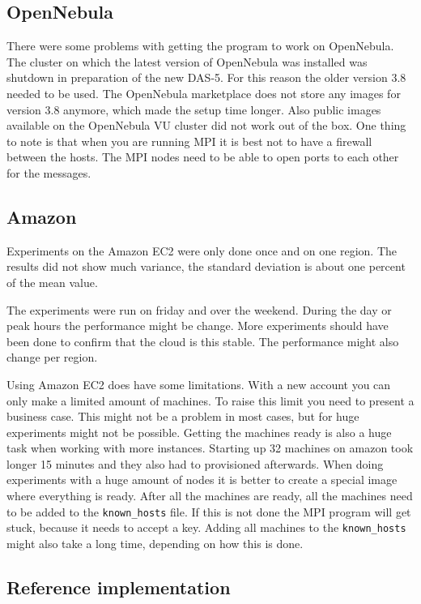 \subsection{OpenNebula}

There were some problems with getting the program to work on OpenNebula. The cluster on which the latest version of OpenNebula was installed was shutdown in preparation of the new DAS-5. For this reason the older version 3.8 needed to be used. The OpenNebula marketplace does not store any images for version 3.8 anymore, which made the setup time longer. Also public images available on the OpenNebula VU cluster did not work out of the box.
One thing to note is that when you are running MPI it is best not to have a firewall between the hosts. The MPI nodes need to be able to open ports to each other for the messages.  

\subsection{Amazon}
Experiments on the Amazon EC2 were only done once and on one region. The results did not show much variance, the standard deviation is about one percent of the mean value.

The experiments were run on friday and over the weekend. During the day or peak hours the performance might be change. More experiments should have been done to confirm that the cloud is this stable. The performance might also change per region. 


Using Amazon EC2 does have some limitations. With a new account you can only make a limited amount of machines. To raise this limit you need to present a business case. This might not be a problem in most cases, but for huge experiments might not be possible. Getting the machines ready is also a huge task when working with more instances. Starting up 32 machines on amazon took longer 15 minutes and they also had to provisioned afterwards. When doing experiments with a huge amount of nodes it is better to create a special image where everything is ready. After all the machines are ready, all the machines need to be added to the \texttt{known\_hosts} file. If this is not done the MPI program will get stuck, because it needs to accept a key. Adding all machines to the \texttt{known\_hosts} might also take a long time, depending on how this is done.


\subsection{Reference implementation}


